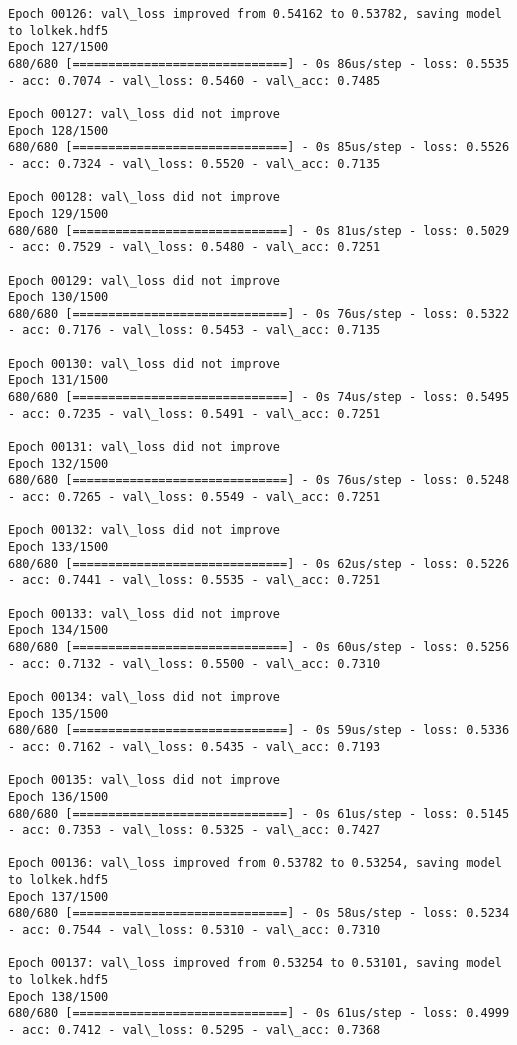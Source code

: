 \documentclass[11pt]{article}
\begin{document}
\begin{Verbatim}[commandchars=\\\{\}]
Epoch 00126: val\_loss improved from 0.54162 to 0.53782, saving model to lolkek.hdf5
Epoch 127/1500
680/680 [==============================] - 0s 86us/step - loss: 0.5535 - acc: 0.7074 - val\_loss: 0.5460 - val\_acc: 0.7485

Epoch 00127: val\_loss did not improve
Epoch 128/1500
680/680 [==============================] - 0s 85us/step - loss: 0.5526 - acc: 0.7324 - val\_loss: 0.5520 - val\_acc: 0.7135

Epoch 00128: val\_loss did not improve
Epoch 129/1500
680/680 [==============================] - 0s 81us/step - loss: 0.5029 - acc: 0.7529 - val\_loss: 0.5480 - val\_acc: 0.7251

Epoch 00129: val\_loss did not improve
Epoch 130/1500
680/680 [==============================] - 0s 76us/step - loss: 0.5322 - acc: 0.7176 - val\_loss: 0.5453 - val\_acc: 0.7135

Epoch 00130: val\_loss did not improve
Epoch 131/1500
680/680 [==============================] - 0s 74us/step - loss: 0.5495 - acc: 0.7235 - val\_loss: 0.5491 - val\_acc: 0.7251

Epoch 00131: val\_loss did not improve
Epoch 132/1500
680/680 [==============================] - 0s 76us/step - loss: 0.5248 - acc: 0.7265 - val\_loss: 0.5549 - val\_acc: 0.7251

Epoch 00132: val\_loss did not improve
Epoch 133/1500
680/680 [==============================] - 0s 62us/step - loss: 0.5226 - acc: 0.7441 - val\_loss: 0.5535 - val\_acc: 0.7251

Epoch 00133: val\_loss did not improve
Epoch 134/1500
680/680 [==============================] - 0s 60us/step - loss: 0.5256 - acc: 0.7132 - val\_loss: 0.5500 - val\_acc: 0.7310

Epoch 00134: val\_loss did not improve
Epoch 135/1500
680/680 [==============================] - 0s 59us/step - loss: 0.5336 - acc: 0.7162 - val\_loss: 0.5435 - val\_acc: 0.7193

Epoch 00135: val\_loss did not improve
Epoch 136/1500
680/680 [==============================] - 0s 61us/step - loss: 0.5145 - acc: 0.7353 - val\_loss: 0.5325 - val\_acc: 0.7427

Epoch 00136: val\_loss improved from 0.53782 to 0.53254, saving model to lolkek.hdf5
Epoch 137/1500
680/680 [==============================] - 0s 58us/step - loss: 0.5234 - acc: 0.7544 - val\_loss: 0.5310 - val\_acc: 0.7310

Epoch 00137: val\_loss improved from 0.53254 to 0.53101, saving model to lolkek.hdf5
Epoch 138/1500
680/680 [==============================] - 0s 61us/step - loss: 0.4999 - acc: 0.7412 - val\_loss: 0.5295 - val\_acc: 0.7368


\end{Verbatim}
\end{document}

